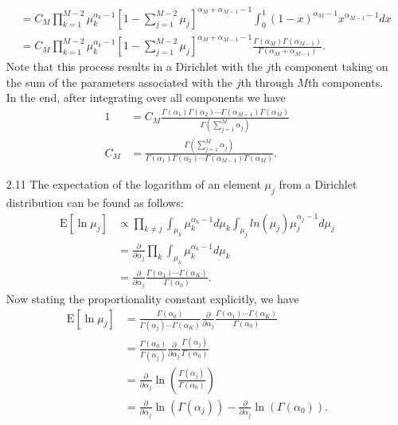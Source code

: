 \documentclass[]{article}
\begin{document}
\begin{enumerate}
\begin{align*}
	&= C_M \prod_{k=1}^{M-2} \mu_k^{\alpha_k - 1} \left[ 1 - \sum_{j=1}^{M-2} \mu_j \right]^{\alpha_M + \alpha_{M-1} -1} \int_{0}^{1} (1-x)^{\alpha_M - 1}x^{\alpha_{M-1} - 1}dx \\
	&=C_M \prod_{k=1}^{M-2} \mu_k^{\alpha_k - 1} \left[ 1 - \sum_{j=1}^{M-2} \mu_j \right]^{\alpha_M + \alpha_{M-1} -1} \frac{\Gamma(\alpha_M)\Gamma(\alpha_{M-1})}{\Gamma(\alpha_{M}+\alpha_{M-1})}.
	\end{align*}
	Note that this process results in a Dirichlet with the $j$th component taking on the sum of the parameters associated with the $j$th through $M$th components. In the end, after integrating over all components we have
	\begin{align*}
	1 &= C_M \frac{\Gamma(\alpha_1)\Gamma(\alpha_2)\cdots \Gamma(\alpha_{M-1})\Gamma(\alpha_{M})}{\Gamma(\sum_{j=1}^{M}\alpha_j)} \\
	C_M &= \frac{\Gamma(\sum_{j=1}^{M}\alpha_j)}{\Gamma(\alpha_1)\Gamma(\alpha_2)\cdots \Gamma(\alpha_{M-1})\Gamma(\alpha_{M})}.
	\end{align*}
	\item[2.11] The expectation of the logarithm of an element $\mu_j$ from a Dirichlet distribution can be found as follows:
	\begin{align*}
	\text{E}[\ln \mu_j] &\propto \prod_{k \neq j}\int_{\mu_k} \mu_k^{\alpha_k - 1}d\mu_k\int_{\mu_j} ln(\mu_j)\mu_j^{\alpha_j-1} d\mu_j \\
	&=\frac{\partial}{\partial \alpha_j}\prod_{k} \int_{\mu_k} \mu_k^{\alpha_k - 1} d\mu_k \\
	&= \frac{\partial}{\partial \alpha_j} \frac{\Gamma(\alpha_1)\cdots \Gamma(\alpha_K)}{\Gamma(\alpha_0)}.
	\end{align*}
	Now stating the proportionality constant explicitly, we have
	\begin{align*}
	\text{E}[\ln \mu_j] &= \frac{\Gamma(\alpha_0)}{\Gamma(\alpha_j)\cdots \Gamma(\alpha_K)} \frac{\partial}{\partial \alpha_j} \frac{\Gamma(\alpha_1)\cdots \Gamma(\alpha_K)}{\Gamma(\alpha_0)} \\
	&= \frac{\Gamma(\alpha_0)}{\Gamma(\alpha_j)} \frac{\partial}{\partial \alpha_j} \frac{\Gamma(\alpha_j)}{\Gamma(\alpha_0)} \\
	&= \frac{\partial}{\partial \alpha_j} \ln \left(\frac{\Gamma(\alpha_j)}{\Gamma(\alpha_0)}\right) \\
	&=\frac{\partial}{\partial \alpha_j} \ln (\Gamma(\alpha_j)) - \frac{\partial}{\partial \alpha_j} \ln (\Gamma(\alpha_0)).
	\end{align*}

\end{enumerate}
\end{document}
